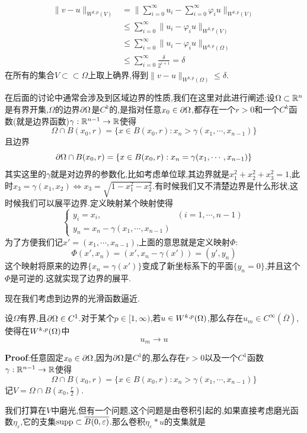 $$
\begin{aligned}
    \|v-u\|_{W^{k,p}(V)} &=\|\sum^{\infty}_{i=0}u_i-\sum^{\infty}_{i=0}\varphi_iu\|_{W^{k,p}(V)}\\
                         &\leqslant \sum^{\infty}_{i=0}\|u_i-\varphi_iu\|_{W^{k,p}(V)}\\
                         &\leqslant \sum^{\infty}_{i=0}\|u_i-\varphi_iu\|_{W^{k,p}(\Omega)}\\
                         &\leqslant \sum^{\infty}_{i=0}\frac{\delta}{2^{i+1}}=\delta
\end{aligned}
$$
在所有的集合$V\subset\subset\Omega$上取上确界,得到$\|v-u\|_{W^{k,p}(\Omega)}\leqslant\delta$.\par
在后面的讨论中通常会涉及到区域边界的性质,我们在这里对此进行阐述:设$\Omega\subset\mathbb{R} ^n$是有界开集,$\Omega$的边界$\partial \Omega$是$C^k$的,是指对任意$x_0\in\partial\Omega$,都存在一个$r>0$和一个$C^k$函数(就是边界函数)$\gamma:\mathbb{R}^{n-1}\to \mathbb{R}$使得
$$
\Omega\cap B(x_0,r)=\{x\in B(x_0,r):x_n>\gamma (x_1,\cdots,x_{n-1})\}
$$
且边界
$$
\partial\Omega\cap B(x_0,r)=\{x\in B(x_0,r):x_n=\gamma (x_1,\cdots,x_{n-1})\}
$$
其实这里的$\gamma$就是对边界的参数化,比如考虑单位球,其边界就是$x_1^2+x^2_2+x_3^2=1$,此时$x_3=\gamma(x_1,x_2)\Leftrightarrow x_3=\sqrt{1-x_1^2-x_2^2}$.有时候我们又不清楚边界是什么形状,这时候我们可以展平边界.定义映射某个映射使得
$$
\begin{cases}
    y_i=x_i,&(i=1,\cdots,n-1)\\
    y_n=x_n-\gamma(x_1,\cdots,x_{n-1})
\end{cases}
$$
为了方便我们记$x'=(x_1,\cdots,x_{n-1})$,上面的意思就是定义映射$\mathbf{\varPhi}$:
$$
\mathbf{\varPhi}(x',x_n)=(x',x_n-\gamma(x'))=(y',y_n)
$$
这个映射将原来的边界$\{x_n=\gamma(x')\}$变成了新坐标系下的平面$\{y_n=0\}$,并且这个$\mathbf{\varPhi}$是可逆的.这就实现了边界的展平.\par
现在我们考虑到边界的光滑函数逼近.
\begin{tcolorbox}[colback=KuangNei,colframe=BianKuang,title=\textbf{用光滑到边界的函数全局逼近},sharpish corners]
   设$\Omega$有界,且$\partial\Omega\in C^1$.对于某个$p\in[1,\infty)$,若$u\in W^{k,p}(\Omega)$,那么存在$u_m\in C^{\infty}(\overline{\Omega})$,使得在$W^{k,p}(\Omega)$中
   $$
    u_m\to u
   $$
\end{tcolorbox}
\textbf{Proof}:任意固定$x_0\in\partial\Omega$,因为$\partial\Omega$是$C^1$的,那么存在$r>0$以及一个$C^1$函数$\gamma:\mathbb{R}^{n-1}\to\mathbb{R}$使得
$$
\Omega\cap B(x_0,r)=\{x\in B(x_0,r):x_n>\gamma (x_1,\cdots,x_{n-1})\}
$$
记$V=\Omega\cap B(x_0,\frac{r}{2})$.\par
我们打算在$V$中磨光,但有一个问题,这个问题是由卷积引起的,如果直接考虑磨光函数$\eta_{\varepsilon}$,它的支集$\operatorname{supp}\subset \overline{B(0,\varepsilon)}$.那么卷积$\eta_{\varepsilon}\ast u$的支集就是
